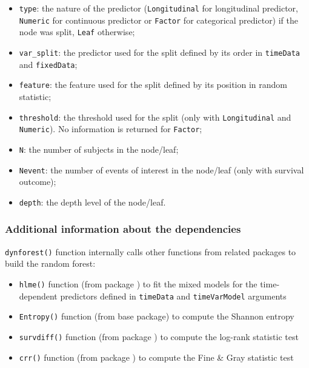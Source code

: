 \begin{itemize}
\tightlist
\item
  \texttt{type}: the nature of the predictor (\texttt{Longitudinal} for longitudinal predictor, \texttt{Numeric} for continuous predictor or \texttt{Factor} for categorical predictor) if the node was split, \texttt{Leaf} otherwise;
\item
  \texttt{var\_split}: the predictor used for the split defined by its order in \texttt{timeData} and \texttt{fixedData};
\item
  \texttt{feature}: the feature used for the split defined by its position in random statistic;
\item
  \texttt{threshold}: the threshold used for the split (only with \texttt{Longitudinal} and \texttt{Numeric}). No information is returned for \texttt{Factor};
\item
  \texttt{N}: the number of subjects in the node/leaf;
\item
  \texttt{Nevent}: the number of events of interest in the node/leaf (only with survival outcome);
\item
  \texttt{depth}: the depth level of the node/leaf.
\end{itemize}

\subsubsection{Additional information about the dependencies}\label{additional-information-about-the-dependencies}

\texttt{dynforest()} function internally calls other functions from related packages to build the random forest:

\begin{itemize}
\tightlist
\item
  \texttt{hlme()} function (from  package \citep{proust_lima_estimation_2017}) to fit the mixed models for the time-dependent predictors defined in \texttt{timeData} and \texttt{timeVarModel} arguments
\item
  \texttt{Entropy()} function (from base package) to compute the Shannon entropy
\item
  \texttt{survdiff()} function (from  package \citep{therneau_2022_survival}) to compute the log-rank statistic test
\item
  \texttt{crr()} function (from  package \citep{gray_cmprsk_2020}) to compute the Fine \& Gray statistic test
\end{itemize}

